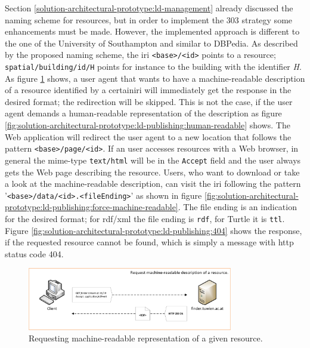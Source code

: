 \documentclass[draft,final]{vutinfth} %
\begin{document}
Section \ref{solution-architectural-prototype:ld-management} already discussed the naming scheme for resources, but in order to implement the 303 strategy some enhancements must be made. However, the implemented approach is different to the one of the University of Southampton and similar to DBPedia. As described by the proposed naming scheme, the \gls{iri} \texttt{<base>/<id>} points to a resource; \texttt{spatial/building/id/H} points for instance to the building with the identifier \textit{H}. As figure \ref{fig:solution-architectural-prototype:ld-publishing:machine-readable} shows, a user agent that wants to have a machine-readable description of a resource identified by a certain\gls{iri} will immediately get the response in the desired format; the redirection will be skipped. This is not the case, if the user agent demands a human-readable representation of the description as figure \ref{fig:solution-architectural-prototype:ld-publishing:human-readable} shows. The Web application will redirect the user agent to a new location that follows the pattern \texttt{<base>/page/<id>}. If an user accesses resources with a Web browser, in general the mime-type \texttt{text/html} will be in the \texttt{Accept} field and the user always gets the Web page describing the resource. Users, who want to download or take a look at the machine-readable description, can visit the \gls{iri} following the pattern '\texttt{<base>/data/<id>.<fileEnding>}' as shown in figure \ref{fig:solution-architectural-prototype:ld-publishing:force-machine-readable}. The file ending is an indication for the desired format; for \gls{rdf}/\gls{xml} the file ending is \texttt{rdf}, for Turtle it is \texttt{ttl}. Figure \ref{fig:solution-architectural-prototype:ld-publishing:404} shows the response, if the requested resource cannot be found, which is simply a message with \gls{http} status code 404.

\begin{figure}[h]
    \centering
    \includegraphics[width=0.8\textwidth]{graphics/solution/uri-strategy/uriStrategyMachineReadable.png}
    \caption{Requesting machine-readable representation of a given resource.}
    \label{fig:solution-architectural-prototype:ld-publishing:machine-readable}
\end{figure}
\end{document}
